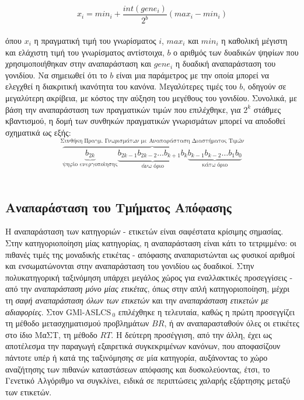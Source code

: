\begin{equation} 
x_{i}=min_{i}+\frac{int(gene_{i})}{2^b}(max_{i} - min_{i}) 
\end{equation}  
\\
όπου $x_{i}$ η πραγματική τιμή του γνωρίσματος $i$, $max_{i}$ και $min_{i}$ η καθολική μέγιστη και ελάχιστη τιμή του γνωρίσματος αντίστοιχα, $b$ ο αριθμός των δυαδικών ψηφίων που χρησιμοποιήθηκαν στην αναπαράσταση και $gene_{i}$ η δυαδική αναπαράσταση του γονιδίου. Να σημειωθεί ότι το $b$ είναι μια παράμετρος με την οποία μπορεί να ελεγχθεί η διακριτική ικανότητα του κανόνα. Μεγαλύτερες τιμές του $b$, οδηγούν σε μεγαλύτερη ακρίβεια, με κόστος την αύξηση του μεγέθους του γονιδίου. Συνολικά, με βάση την αναπαράσταση των πραγματικών τιμών που επιλέχθηκε, για $2^{k}$ στάθμες κβαντισμού, η δομή των συνθηκών πραγματικών γνωρισμάτων μπορεί να αποδοθεί σχηματικά ως εξής:
\\

$$ \overbrace{
\underbrace{b_{2k}}_\text{ψηφίο ενεργοποίησης}
\underbrace{b_{2k-1}b_{2k-2}
\dots b_{k+1}b_{k}}_\text{άνω όριο}
\underbrace{b_{k-1}b_{k-2
}\dots b_1b_0}_\text{κάτω όριο}}
^\text{Συνθήκη Πραγμ. Γνωρισμάτων με Αναπαράσταση Διαστήματος Τιμών}$$
\\

\subsection{Αναπαράσταση του Τμήματος Απόφασης}
Η αναπαράσταση των κατηγοριών - ετικετών είναι σαφέστατα κρίσιμης σημασίας. Στην κατηγοριοποίηση μίας κατηγορίας, η αναπαράσταση είναι κάτι το τετριμμένο: οι πιθανές τιμές της μοναδικής ετικέτας - απόφασης αναπαριστώνται ως φυσικοί αριθμοί και ενσωματώνονται στην αναπαράσταση του γονιδίου ως δυαδικοί. Στην πολυκατηγορική ταξινόμηση υπάρχει μεγάλος χώρος για εναλλακτικές προσεγγίσεις - από την \emph{αναπαράσταση μόνο μίας ετικέτας}, όπως στην απλή κατηγοριοποίηση, μέχρι τη \emph{σαφή αναπαράσταση όλων των ετικετών} και την \emph{αναπαράσταση ετικετών με αδιαφορίες}. Στον GMl-ASLCS$_{\:0}$ επιλέχθηκε η τελευταία, καθώς η πρώτη προσεγγίζει τη μέθοδο μετασχηματισμού προβλημάτων $BR$, ή αν αναπαρασταθούν όλες οι ετικέτες στο ίδιο ΜαΣΤ, τη μέθοδο $RT$. Η δεύτερη προσέγγιση, από την άλλη, έχει ως αποτέλεσμα την παραγωγή εξαιρετικά συγκεκριμένων κανόνων, που αποφασίζουν πάντοτε υπέρ ή κατά της ταξινόμησης σε μία κατηγορία, αυξάνοντας το χώρο αναζήτησης των πιθανών καταστάσεων απόφασης και δυσκολεύοντας, έτσι, το Γενετικό Αλγόριθμο να συγκλίνει, ειδικά σε περιπτώσεις χαλαρής εξάρτησης μεταξύ των ετικετών. 

